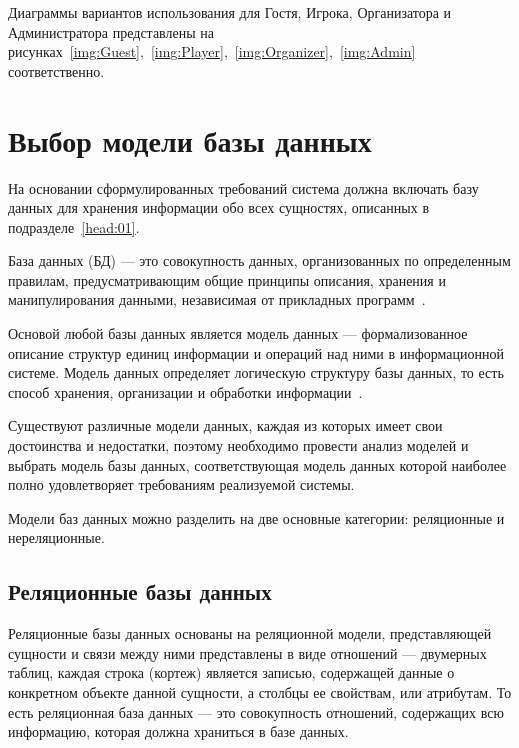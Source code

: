 Диаграммы вариантов использования для Гостя, Игрока, Организатора и
Администратора представлены на
рисунках~\ref{img:Guest},~\ref{img:Player},~\ref{img:Organizer},~\ref{img:Admin}
соответственно.



\section{Выбор модели базы данных}

На основании сформулированных требований система должна включать базу данных для
хранения информации обо всех сущностях, описанных в подразделе~\ref{head:01}.

База данных (БД) --- это совокупность данных, организованных по определенным
правилам, предусматривающим общие принципы описания, хранения и манипулирования
данными, независимая от прикладных программ~\cite{gost01}.

Основой любой базы данных является модель данных --- формализованное описание
структур единиц информации и операций над ними в информационной системе.
Модель данных определяет логическую структуру базы данных, то есть
способ хранения, организации и обработки информации~\cite{book01}.

Существуют различные модели данных, каждая из которых имеет свои достоинства и
недостатки, поэтому необходимо провести анализ моделей и выбрать модель базы
данных, соответствующая модель данных которой наиболее полно удовлетворяет
требованиям реализуемой системы.

Модели баз данных можно разделить на две основные категории: реляционные и
нереляционные.

\subsection{Реляционные базы данных}

Реляционные базы данных основаны на реляционной модели, представляющей сущности и
связи между ними представлены в виде отношений --- двумерных таблиц, каждая
строка (кортеж) является записью, содержащей данные о конкретном объекте данной
сущности, а столбцы ее свойствам, или атрибутам. То есть реляционная база
данных --- это совокупность отношений, содержащих всю информацию, которая должна
храниться в базе данных.

